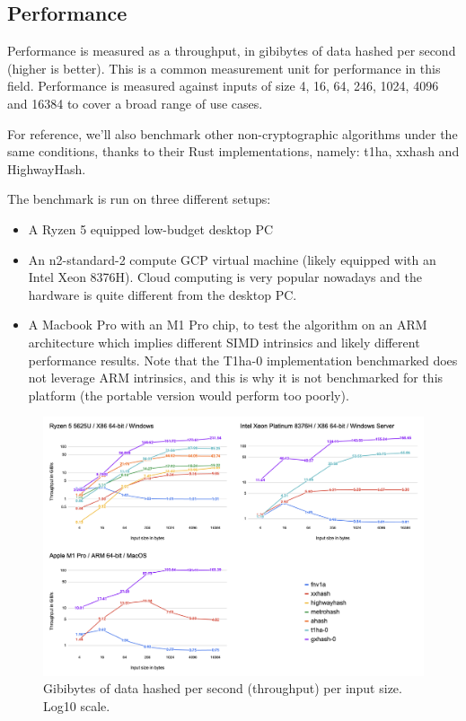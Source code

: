 \documentclass[10pt]{article}
\begin{document}
\clearpage
\subsection{Performance}

Performance is measured as a throughput, in gibibytes of data hashed per second (higher is better). This is a common measurement unit for performance in this field. Performance is measured against inputs of size 4, 16, 64, 246, 1024, 4096 and 16384 to cover a broad range of use cases.

For reference, we'll also benchmark other non-cryptographic algorithms under the same conditions, thanks to their Rust implementations, namely: t1ha\cite{rust-t1ha}, xxhash\cite{twox-hash} and HighwayHash\cite{highway-rs}.

The benchmark is run on three different setups:
\begin{itemize}
    \item A Ryzen 5 equipped low-budget desktop PC
    \item An n2-standard-2 compute GCP virtual machine (likely equipped with an Intel Xeon 8376H). Cloud computing is very popular nowadays and the hardware is quite different from the desktop PC.
    \item A Macbook Pro with an M1 Pro chip, to test the algorithm on an ARM architecture which implies different SIMD intrinsics and likely different performance results. Note that the T1ha-0 implementation benchmarked does not leverage ARM intrinsics, and this is why it is not benchmarked for this platform (the portable version would perform too poorly).
\end{itemize}

\begin{figure}[H]
\centering
\includegraphics[width=1\textwidth]{throughput.png}
\caption{Gibibytes of data hashed per second (throughput) per input size. Log10 scale.}
\label{fig:benchmark-throughput}
\end{figure}
\end{document}
